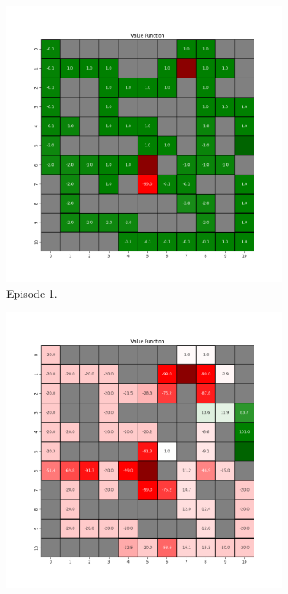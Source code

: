 \documentclass{assignment}
\begin{document}
\begin{figure}[H]
    \begin{subfigure}{0.3\textwidth}
        \includegraphics[width=\textwidth]{figures/value_td/alpha_sweep/value_function_alpha_1_gamma_0.95_epsilon_0.2_iteration_1.png}
    \caption{Episode 1.}
    \end{subfigure}\hfill
    \begin{subfigure}{0.3\textwidth}
        \includegraphics[width=\textwidth]{figures/value_td/alpha_sweep/value_function_alpha_1_gamma_0.95_epsilon_0.2_iteration_50.png}

\end{subfigure}
\end{figure}
\end{document}
